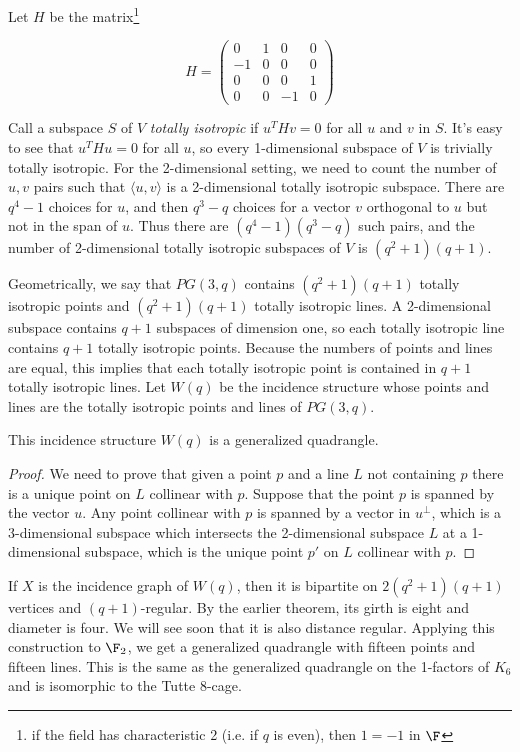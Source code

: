 Let $H$ be the matrix\footnote{if the field has characteristic 2 (i.e. if $q$ is even), then $1=-1$ in $\F$}

$$H=\begin{pmatrix}
0&1&0&0\\
-1&0&0&0\\
0&0&0&1\\
0&0&-1&0
\end{pmatrix}$$



Call a subspace $S$ of $V$ \textit{totally isotropic} if $u^THv=0$ for all $u$ and $v$ in $S$.  It's easy to see that $u^THu=0$ for all $u$, so every 1-dimensional subspace of $V$ is trivially totally isotropic.  For the 2-dimensional setting, we need to count the number of $u,v$ pairs such that $\langle u,v\rangle$ is a 2-dimensional totally isotropic subspace.  There are $q^4-1$ choices for $u$, and then $q^3-q$ choices for a vector $v$ orthogonal to $u$ but not in the span of $u$.  Thus there are $(q^4-1)(q^3-q)$ such pairs, and the number of 2-dimensional totally isotropic subspaces of $V$ is $(q^2+1)(q+1)$.  

Geometrically, we say that $PG(3,q)$ contains $(q^2+1)(q+1)$ totally isotropic points and $(q^2+1)(q+1)$ totally isotropic lines.  A 2-dimensional subspace contains $q+1$ subspaces of dimension one, so each totally isotropic line contains $q+1$ totally isotropic points.  Because the numbers of points and lines are equal, this implies that each totally isotropic point is contained in $q+1$ totally isotropic lines.  Let $W(q)$ be the incidence structure whose points and lines are the totally isotropic points and lines of $PG(3,q)$.

\begin{lemma}
	This incidence structure $W(q)$ is a generalized quadrangle.
	
\end{lemma}
\begin{proof}
	We need to prove that given a point $p$ and a line $L$ not containing $p$ there is a unique point on $L$ collinear with $p$.  Suppose that the point $p$ is spanned by the vector $u$.  Any point collinear with $p$ is spanned by a vector in $u^\perp$, which is a 3-dimensional subspace which intersects the 2-dimensional subspace $L$ at a 1-dimensional subspace, which is the unique point $p'$ on $L$ collinear with $p$.
	
\end{proof}


If $X$ is the incidence graph of $W(q)$, then it is bipartite on $2(q^2+1)(q+1)$ vertices and $(q+1)$-regular.  By the earlier theorem, its girth is eight and diameter is four.  We will see soon that it is also distance regular.  Applying this construction to $\F_2$, we get a generalized quadrangle with fifteen points and fifteen lines.  This is the same as the generalized quadrangle on the 1-factors of $K_6$ and is isomorphic to the Tutte 8-cage.

